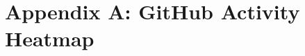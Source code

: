      \chapter{Appendix A: GitHub Activity Heatmap}

     \begin{figure}[!htb]
     \centering
	\label{fig:github}
	\end{figure}